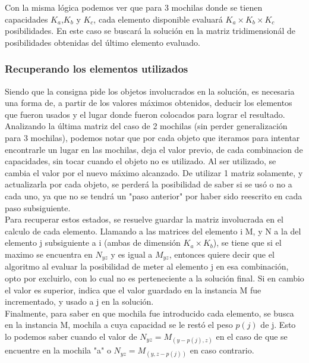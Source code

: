   Con la misma lógica podemos ver que para 3 mochilas donde se tienen capacidades  $K_{a}$,$K_{b}$ y $K_{c}$, cada elemento disponible evaluará $K_{a} \times K_{b} \times K_{c}$ posibilidades. En este caso se buscará la solución en la matriz tridimensionál de posibilidades obtenidas del último elemento evaluado.

\subsubsection*{Recuperando los elementos utilizados}

Siendo que la consigna pide los objetos involucrados en la solución, es necesaria una forma de, a partir de los valores máximos obtenidos, deducir los elementos que fueron usados y el lugar donde fueron colocados para lograr el resultado.\\

Analizando la última matriz del caso de 2 mochilas (sin perder generalización para 3 mochilas), podemos notar que por cada objeto que iteramos para intentar encontrarle un lugar en las mochilas, deja el valor previo, de cada combinacion de capacidades, sin tocar cuando el objeto no es utilizado. Al ser utilizado, se cambia el valor por el nuevo máximo alcanzado. De utilizar 1 matriz solamente, y actualizarla por cada objeto, se perderá la posibilidad de saber si se usó o no a cada uno, ya que no se tendrá un "paso anterior" por haber sido reescrito en cada paso subsiguiente. \\

Para recuperar estos estados, se resuelve guardar la matriz involucrada en el calculo de cada elemento. Llamando a las matrices del elemento i M, y N a la del elemento j subsiguiente a i (ambas de dimensión $K_{a} \times K_{b}$), se tiene que si el maximo se encuentra en $N_{yz}$ y es igual a $M_{yz}$, entonces quiere decir que el algoritmo al evaluar la posibilidad de meter al elemento j en esa combinación, opto por excluirlo, con lo cual no es perteneciente a la solución final. Si en cambio el valor es superior, indica que el valor guardado en la instancia M fue incrementado, y usado a j en la solución.\\

Finalmente, para saber en que mochila fue introducido cada elemento, se busca en la instancia M, mochila a cuya capacidad se le restó el peso $p(j)$ de j. Esto lo podemos saber cuando el valor de $N_{yz} = M_{(y-p(j),z)}$ en el caso de que se encuentre en la mochila "a" o $N_{yz} = M_{(y,z-p(j))}$ en caso contrario.\\


